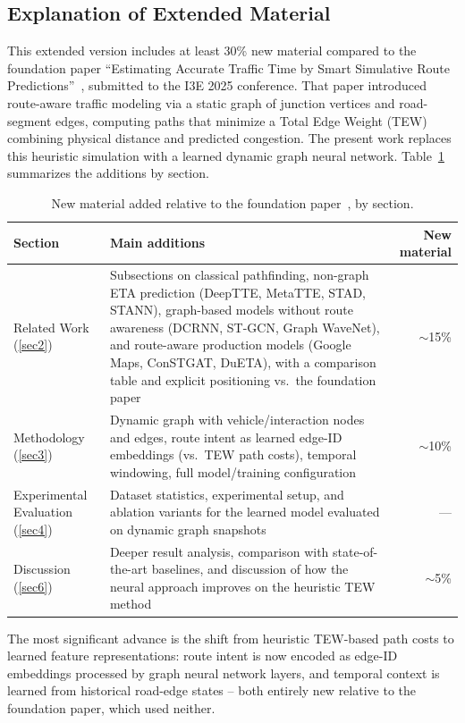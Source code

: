 \begin{appendices}

\section{Explanation of Extended Material}\label{secA1}

This extended version includes at least 30\% new material compared to the foundation paper ``Estimating Accurate Traffic Time by Smart Simulative Route Predictions''~\cite{SmartSimulativeRoute2025}, submitted to the I3E 2025 conference. That paper introduced route-aware traffic modeling via a static graph of junction vertices and road-segment edges, computing paths that minimize a Total Edge Weight (TEW) combining physical distance and predicted congestion. The present work replaces this heuristic simulation with a learned dynamic graph neural network. Table~\ref{tab:extension-summary} summarizes the additions by section.

\begin{table}[h]
\centering
\caption{New material added relative to the foundation paper~\cite{SmartSimulativeRoute2025}, by section.}
\label{tab:extension-summary}
\begin{tabular}{@{}lp{6.3cm}r@{}}
\toprule
\textbf{Section} & \textbf{Main additions} & \textbf{New material} \\
\midrule
Related Work (\ref{sec2}) & Subsections on classical pathfinding, non-graph ETA prediction (DeepTTE, MetaTTE, STAD, STANN), graph-based models without route awareness (DCRNN, ST-GCN, Graph WaveNet), and route-aware production models (Google Maps, ConSTGAT, DuETA), with a comparison table and explicit positioning vs.\ the foundation paper & $\sim$15\% \\
Methodology (\ref{sec3}) & Dynamic graph with vehicle/interaction nodes and edges, route intent as learned edge-ID embeddings (vs.\ TEW path costs), temporal windowing, full model/training configuration & $\sim$10\% \\
Experimental Evaluation (\ref{sec4}) & Dataset statistics, experimental setup, and ablation variants for the learned model evaluated on dynamic graph snapshots & --- \\
Discussion (\ref{sec6}) & Deeper result analysis, comparison with state-of-the-art baselines, and discussion of how the neural approach improves on the heuristic TEW method & $\sim$5\% \\
\bottomrule
\end{tabular}
\end{table}

The most significant advance is the shift from heuristic TEW-based path costs to learned feature representations: route intent is now encoded as edge-ID embeddings processed by graph neural network layers, and temporal context is learned from historical road-edge states -- both entirely new relative to the foundation paper, which used neither.

\end{appendices}
